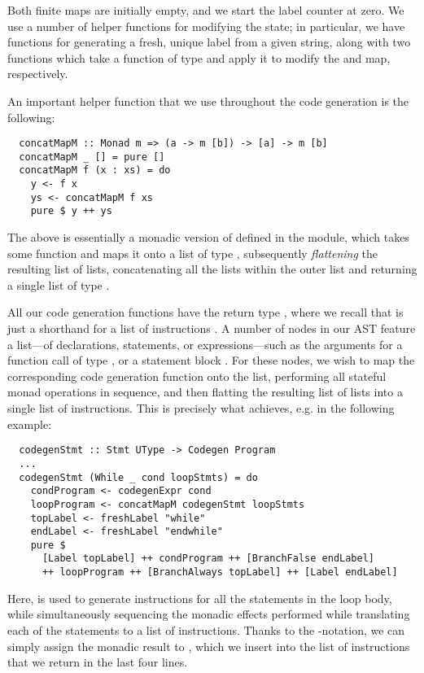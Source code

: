 Both finite maps are initially empty, and we start the label counter at zero.
We use a number of helper functions for modifying the state; in particular, we
have functions for generating a fresh, unique label from a given string, along
with two functions which take a function of type
 and apply it to modify the
 and  map, respectively.

An important helper function that we use throughout the code generation is the
following:
\begin{verbatim}
  concatMapM :: Monad m => (a -> m [b]) -> [a] -> m [b]
  concatMapM _ [] = pure []
  concatMapM f (x : xs) = do
    y <- f x
    ys <- concatMapM f xs
    pure $ y ++ ys
\end{verbatim}
%
The above is essentially a monadic version of
 defined in the 
module, which takes some function  and maps it onto a
list of type \haskell{[a]}, subsequently \emph{flattening} the resulting
list of lists, concatenating all the lists within the outer list and returning
a single list of type \haskell{[b]}.

All our code generation functions have the return type ,
where we recall that  is just a shorthand for a list of
instructions \haskell{[Instr]}.
A number of nodes in our AST feature a list---of declarations, statements,
or expressions---such as the arguments for a function call of type
, or a statement block .
For these nodes, we wish to map the corresponding code generation function onto
the list, performing all stateful monad operations in sequence, and then
flatting the resulting list of lists into a single list of instructions.
This is precisely what  achieves, e.g. in the following
example:
%
\begin{verbatim}
  codegenStmt :: Stmt UType -> Codegen Program
  ...
  codegenStmt (While _ cond loopStmts) = do
    condProgram <- codegenExpr cond
    loopProgram <- concatMapM codegenStmt loopStmts
    topLabel <- freshLabel "while"
    endLabel <- freshLabel "endwhile"
    pure $
      [Label topLabel] ++ condProgram ++ [BranchFalse endLabel]
      ++ loopProgram ++ [BranchAlways topLabel] ++ [Label endLabel]
\end{verbatim}

Here,  is used to generate instructions for
all the statements in the loop body, while simultaneously sequencing the monadic
effects performed while translating each of the statements to a list of
instructions. Thanks to the -notation, we can simply assign the
monadic result to , which we insert into the list of
instructions that we return in the last four lines.

